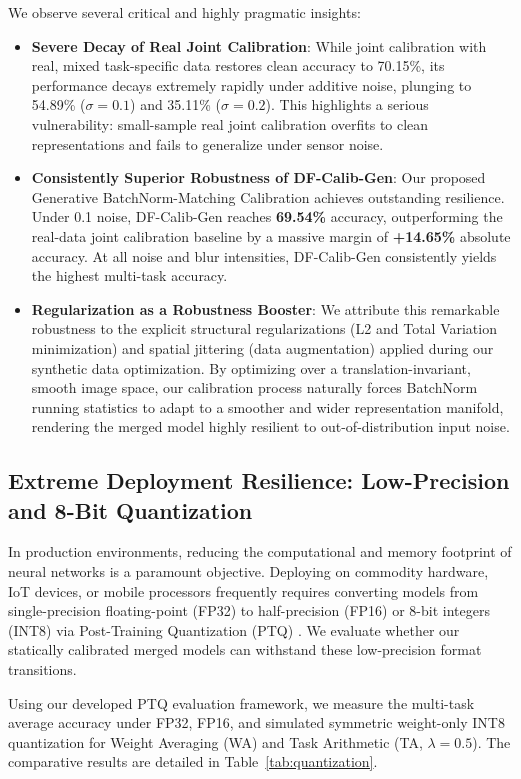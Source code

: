 \documentclass{article}
\theoremstyle{plain}
\theoremstyle{definition}
\theoremstyle{remark}
\begin{document}
We observe several critical and highly pragmatic insights:
\begin{itemize}
  \item \textbf{Severe Decay of Real Joint Calibration}: While joint calibration with real, mixed task-specific data restores clean accuracy to 70.15\%, its performance decays extremely rapidly under additive noise, plunging to 54.89\% ($\sigma=0.1$) and 35.11\% ($\sigma=0.2$). This highlights a serious vulnerability: small-sample real joint calibration overfits to clean representations and fails to generalize under sensor noise.
  \item \textbf{Consistently Superior Robustness of DF-Calib-Gen}: Our proposed Generative BatchNorm-Matching Calibration achieves outstanding resilience. Under 0.1 noise, DF-Calib-Gen reaches \textbf{69.54\%} accuracy, outperforming the real-data joint calibration baseline by a massive margin of \textbf{+14.65\%} absolute accuracy. At all noise and blur intensities, DF-Calib-Gen consistently yields the highest multi-task accuracy.
  \item \textbf{Regularization as a Robustness Booster}: We attribute this remarkable robustness to the explicit structural regularizations (L2 and Total Variation minimization) and spatial jittering (data augmentation) applied during our synthetic data optimization. By optimizing over a translation-invariant, smooth image space, our calibration process naturally forces BatchNorm running statistics to adapt to a smoother and wider representation manifold, rendering the merged model highly resilient to out-of-distribution input noise.
\end{itemize}

\subsection{Extreme Deployment Resilience: Low-Precision and 8-Bit Quantization}
In production environments, reducing the computational and memory footprint of neural networks is a paramount objective. Deploying on commodity hardware, IoT devices, or mobile processors frequently requires converting models from single-precision floating-point (FP32) to half-precision (FP16) or 8-bit integers (INT8) via Post-Training Quantization (PTQ) \cite{Nagel2019}. We evaluate whether our statically calibrated merged models can withstand these low-precision format transitions.

Using our developed PTQ evaluation framework, we measure the multi-task average accuracy under FP32, FP16, and simulated symmetric weight-only INT8 quantization for Weight Averaging (WA) and Task Arithmetic (TA, $\lambda=0.5$). The comparative results are detailed in Table~\ref{tab:quantization}.
\end{document}
